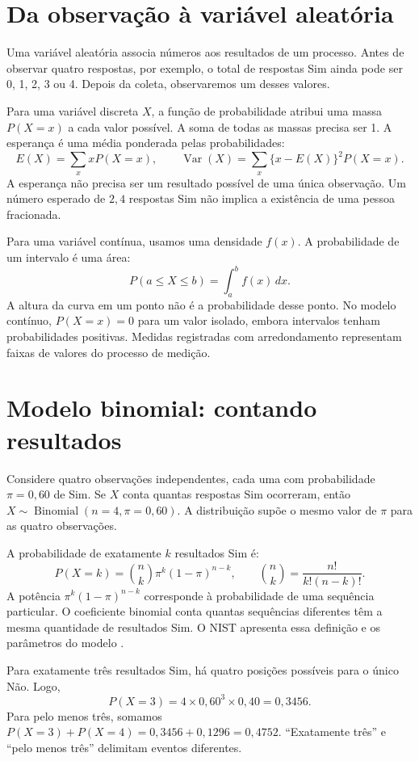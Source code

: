 \section{Da observação à variável aleatória}

Uma variável aleatória associa números aos resultados de um processo. Antes de observar quatro respostas, por exemplo, o total de respostas Sim ainda pode ser 0, 1, 2, 3 ou 4. Depois da coleta, observaremos um desses valores.

Para uma variável discreta $X$, a função de probabilidade atribui uma massa $P(X=x)$ a cada valor possível. A soma de todas as massas precisa ser 1. A esperança é uma média ponderada pelas probabilidades:
\[
E(X)=\sum_x xP(X=x),\qquad
\operatorname{Var}(X)=\sum_x\{x-E(X)\}^2P(X=x).
\]
A esperança não precisa ser um resultado possível de uma única observação. Um número esperado de $2{,}4$ respostas Sim não implica a existência de uma pessoa fracionada.

Para uma variável contínua, usamos uma densidade $f(x)$. A probabilidade de um intervalo é uma área:
\[
P(a\leq X\leq b)=\int_a^b f(x)\,dx.
\]
A altura da curva em um ponto não é a probabilidade desse ponto. No modelo contínuo, $P(X=x)=0$ para um valor isolado, embora intervalos tenham probabilidades positivas. Medidas registradas com arredondamento representam faixas de valores do processo de medição.

\section{Modelo binomial: contando resultados}

Considere quatro observações independentes, cada uma com probabilidade $\pi=0{,}60$ de Sim. Se $X$ conta quantas respostas Sim ocorreram, então $X\sim\operatorname{Binomial}(n=4,\pi=0{,}60)$. A distribuição supõe o mesmo valor de $\pi$ para as quatro observações.

A probabilidade de exatamente $k$ resultados Sim é:
\[
P(X=k)=\binom{n}{k}\pi^k(1-\pi)^{n-k},
\qquad \binom{n}{k}=\frac{n!}{k!(n-k)!}.
\]
A potência $\pi^k(1-\pi)^{n-k}$ corresponde à probabilidade de uma sequência particular. O coeficiente binomial conta quantas sequências diferentes têm a mesma quantidade de resultados Sim. O NIST apresenta essa definição e os parâmetros do modelo \parencite{NISTBinomial}.

Para exatamente três resultados Sim, há quatro posições possíveis para o único Não. Logo,
\[
P(X=3)=4\times0{,}60^3\times0{,}40=0{,}3456.
\]
Para pelo menos três, somamos $P(X=3)+P(X=4)=0{,}3456+0{,}1296=0{,}4752$. ``Exatamente três'' e ``pelo menos três'' delimitam eventos diferentes.

